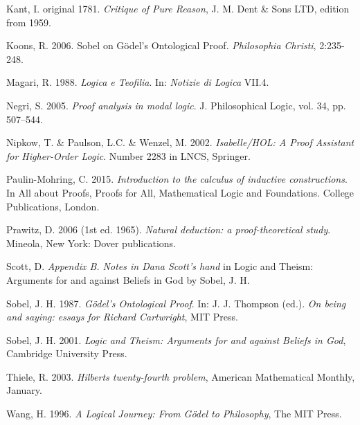 \documentclass[smallextended]{svjour3}
\begin{document}
\begin{thebibliography}{9}
Kant, I.  original 1781. {\itshape Critique of Pure Reason}, J. M. Dent \& Sons LTD, edition from 1959.

Koons, R. 2006. Sobel on G\"odel's Ontological Proof. {\itshape Philosophia Christi}, 2:235-248.

Magari, R. 1988. {\itshape Logica e Teofilia}. In: {\itshape Notizie di Logica} VII.4.

Negri, S. 2005. {\itshape Proof analysis in modal logic}. J. Philosophical Logic, vol. 34, pp. 507--544. 

 Nipkow, T. \& Paulson, L.C. \& Wenzel, M. 2002. {\itshape Isabelle/HOL: A Proof Assistant for
Higher-Order Logic}. Number 2283 in LNCS, Springer.

 Paulin-Mohring, C. 2015. {\itshape Introduction to the calculus of inductive constructions}. In %
All about Proofs, Proofs for All,
Mathematical Logic and Foundations. College Publications, London.

Prawitz, D. 2006 (1st ed. 1965). {\itshape Natural deduction: a proof-theoretical study}. Mineola, New York: Dover publications. 

Scott, D. {\itshape Appendix B. Notes in Dana Scott's hand} in Logic and Theism: Arguments for and against Beliefs in God by Sobel, J. H. 

Sobel, J. H. 1987. {\itshape G\"odel's Ontological Proof}. In: J. J. Thompson (ed.). {\itshape On being and saying: essays for Richard Cartwright},  MIT Press. 

Sobel, J. H. 2001. {\itshape Logic and Theism: Arguments for and against Beliefs in God}, Cambridge University Press. 

 Thiele, R. 2003. {\itshape Hilberts twenty-fourth problem}, American Mathematical Monthly, January. 

Wang, H. 1996. {\itshape A Logical Journey: From G\"odel to Philosophy}, The MIT Press. 








\end{thebibliography}
\end{document}
